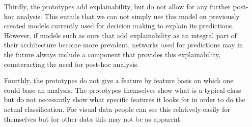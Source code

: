 Thirdly, the prototypes add explainability, but do not allow for any further post-hoc analysis. This entails that we can not simply use this model on previously created models currently used for decision making to explain its predictions. However, if models such as ours that add explainability as an integral part of their architecture become more prevalent, networks used for predictions may in the future always include a component that provides this explainability, counteracting the need for post-hoc analysis.

Fourthly, the prototypes do not give a feature by feature basis on which one could base an analysis. The prototypes themselves show what is a typical class but do not necessarily show what specific features it looks for in order to do the actual classification. For visual data people can see this relatively easily for themselves but for other data this may not be as apparent. 